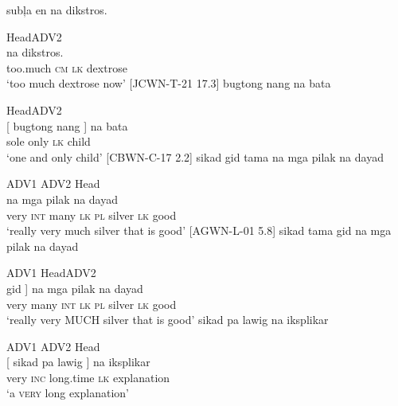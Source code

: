 \ea
\label{bkm:Ref425694314}
subļa  en   na  dikstros. \\\smallskip

Head\hspace{24pt}ADV2 \\
\gll [ subļa  en  ]  na  dikstros. \\
{} too.much  \textsc{cm} {} \textsc{lk}  dextrose \\
\glt ‘too much dextrose now’ [JCWN-T-21 17.3]
\z
\ea
bugtong  nang   na  bata \\\smallskip

  Head\hspace{20pt}ADV2 \\
\gll {}[ bugtong  nang  ]  na  bata \\
 {} sole  only  {}  \textsc{lk}  child \\
\glt ‘one and only child’ [CBWN-C-17 2.2]
\z
\ea
\label{bkm:Ref418078036}
sikad  gid  tama  na  mga  pilak  na  dayad \\\smallskip

ADV1  ADV2  Head \\
  na  mga  pilak  na  dayad \\
 {} very  \textsc{int}  many {} \textsc{lk}  \textsc{pl}  silver  \textsc{lk}  good \\
\glt ‘really very much silver that is good’  [AGWN-L-01 5.8]
\z
\ea
sikad  tama gid    na  mga  pilak  na  dayad \\\smallskip

  \hspace{12pt}ADV1  Head\hspace{12pt}ADV2 \\
\gll [ [ sikad  tama ]\footnotemark {} gid   ]  na  mga  pilak  na  dayad \\
  {} {}  very  many {} \textsc{int} {} \textsc{lk}  \textsc{pl}  silver  \textsc{lk}  good \\
\glt ‘really very MUCH silver that is good’
\z
\ea
\label{bkm:Ref425326439}\label{bkm:Ref424739679}
sikad  pa  lawig  na  iksplikar \\\smallskip

ADV1  ADV2  Head \\
\gll {}[ sikad  pa  { } lawig ]  na  iksplikar \\
{}  very  \textsc{inc}  { } long.time {}  \textsc{lk}  explanation \\
\glt ‘a \textsc{very} long explanation’
\z

